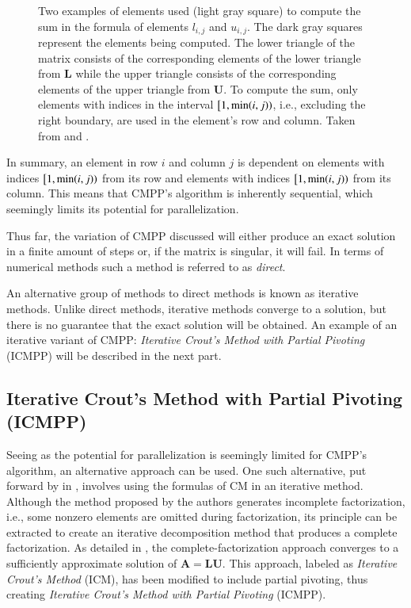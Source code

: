 \begin{figure}[ht!]
\begin{subfigure}{.5\textwidth}
		\label{Figure:theory->ICMPP->LUP->CMPP->sum-in-element-computation-dependance-U}
	\end{subfigure}
	\caption{Two examples of elements used (light gray square) to compute the sum in the formula of elements $l_{i,j}$ and $u_{i,j}$.
		The dark gray squares represent the elements being computed.
		The lower triangle of the matrix consists of the corresponding elements of the lower triangle from $\mathbf{L}$ while the upper triangle consists of the corresponding elements of the upper triangle from $\mathbf{U}$.
		To compute the sum, only elements with indices in the interval $\left[1, \minp{i, j}\right)$, i.e., excluding the right boundary, are used in the element's row and column.
		Taken from  \cite{Cejka2022} and  \cite{Chow2015}.
		}
	\label{Figure:theory->ICMPP->LUP->CMPP->sum-in-element-computation-dependance}
\end{figure}

In summary, an element in row $i$ and column $j$ is dependent on elements with indices $\left[1, \minp{i, j}\right)$ from its row and elements with indices $\left[1, \minp{i, j}\right)$ from its column.
This means that CMPP's algorithm is inherently sequential, which seemingly limits its potential for parallelization.

Thus far, the variation of CMPP discussed will either produce an exact solution in a finite amount of steps or, if the matrix is singular, it will fail.
In terms of numerical methods such a method is referred to as \textit{direct}.

An alternative group of methods to direct methods is known as iterative methods.
Unlike direct methods, iterative methods converge to a solution, but there is no guarantee that the exact solution will be obtained.
An example of an iterative variant of CMPP: \textit{Iterative Crout's Method with Partial Pivoting} (ICMPP) will be described in the next part.

\subsection{Iterative Crout's Method with Partial Pivoting (ICMPP)}\label{Subsection:theory->ICMPP->LUP->ICMPP}
Seeing as the potential for parallelization is seemingly limited for CMPP's algorithm, an alternative approach can be used.
One such alternative, put forward by  in  \cite{Anzt2019}, involves using the formulas of CM in an iterative method.
Although the method proposed by the authors generates incomplete factorization, i.e., some nonzero elements are omitted during factorization, its principle can be extracted to create an iterative decomposition method that produces a complete factorization.
As detailed in  \cite{Cejka2022}, the complete-factorization approach converges to a sufficiently approximate solution of $\mathbf{A} = \mathbf{LU}$.
This approach, labeled as \textit{Iterative Crout's Method} (ICM), has been modified to include partial pivoting, thus creating \textit{Iterative Crout's Method with Partial Pivoting} (ICMPP).

